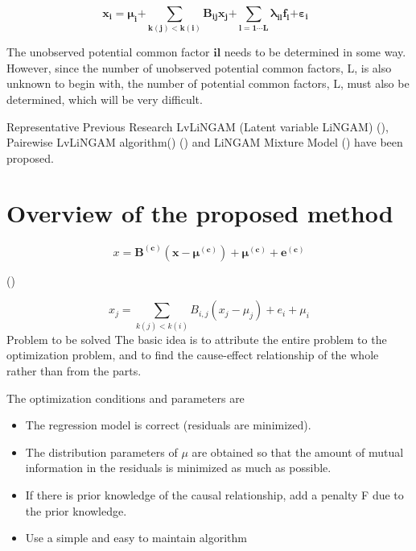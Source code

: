 \documentclass[pdftex]{article}
\begin{document}
\begin{equation}
\mathbf{x}_{\mathbf{i}}\mathbf{=}\mathbf{\mu}_{\mathbf{i}}\mathbf{+}\sum_{\mathbf{k}\left( \mathbf{j} \right)\mathbf{< k(i)}}^{}{\mathbf{B}_{\mathbf{\text{ij}}}\mathbf{x}_{\mathbf{j}}}\mathbf{+}\sum_{\mathbf{l = 1\cdots L}}^{}{\mathbf{\lambda}_{\mathbf{\text{il}}}\mathbf{f}_{\mathbf{l}}}\mathbf{+}\mathbf{\varepsilon}_{\mathbf{i}}\mathbf{\text{\ \ \ \ \ \ \ }}
\end{equation}

The unobserved potential common factor $\mathbf{\text{il}}$ needs to be determined in some way. However, since the number of unobserved potential common factors, L, is also unknown to begin with, the number of potential common factors, L, must also be determined, which will be very difficult.
\clearpage

\par
Representative Previous Research
LvLiNGAM (Latent variable LiNGAM) (\cite{hoyer2008estimation}), Pairewise LvLiNGAM algorithm(\cite{entner2010discovering}) (\cite{tashiro2014parcelingam}) and LiNGAM Mixture Model (\cite{shimizu2014bayesian}) have been proposed.



\section{Overview of the proposed method}
\label{sec:Overview}
\begin{equation}
x = \bm{B^{(c)} (x - \mu^{(c)}) + \mu^{(c)} + e^{(c)}}
\end{equation}
\centerline{(\cite{shimizu2014bayesian})}

\begin{equation}
x_{j} = \sum_{k(j)<k(i)}B_{i,j}(x_{j} - \mu_{j}) + e_{i} + \mu_{i}
\end{equation}
Problem to be solved
The basic idea is to attribute the entire problem to the optimization problem, and to find the cause-effect relationship of the whole rather than from the parts.

The optimization conditions and parameters are
\begin{itemize}
	\item The regression model is correct (residuals are minimized).
	\item The distribution parameters of $\mu$ are obtained so that the amount of mutual information in the residuals is minimized as much as possible.
	\item If there is prior knowledge of the causal relationship, add a penalty F due to the prior knowledge.
	\item Use a simple and easy to maintain algorithm
\end{itemize}
\end{document}
